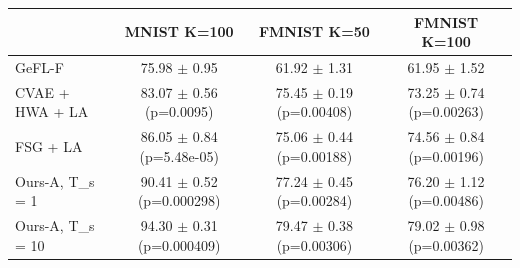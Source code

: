 \begin{tabular}{lccc}
\toprule
 & MNIST K=100 & FMNIST K=50 & FMNIST K=100 \\
\midrule
GeFL-F & 75.98 $\pm$ 0.95 & 61.92 $\pm$ 1.31 & 61.95 $\pm$ 1.52 \\
CVAE + HWA + LA & 83.07 $\pm$ 0.56 (p=0.0095) & 75.45 $\pm$ 0.19 (p=0.00408) & 73.25 $\pm$ 0.74 (p=0.00263) \\
FSG + LA & 86.05 $\pm$ 0.84 (p=5.48e-05) & 75.06 $\pm$ 0.44 (p=0.00188) & 74.56 $\pm$ 0.84 (p=0.00196) \\
Ours-A, T\_s = 1 & 90.41 $\pm$ 0.52 (p=0.000298) & 77.24 $\pm$ 0.45 (p=0.00284) & 76.20 $\pm$ 1.12 (p=0.00486) \\
Ours-A, T\_s = 10 & 94.30 $\pm$ 0.31 (p=0.000409) & 79.47 $\pm$ 0.38 (p=0.00306) & 79.02 $\pm$ 0.98 (p=0.00362) \\
\bottomrule
\end{tabular}
